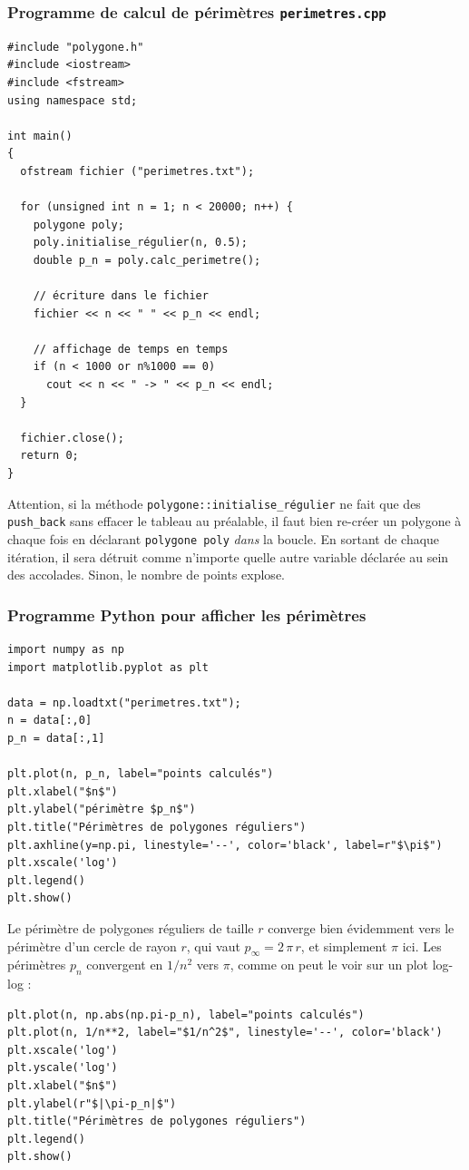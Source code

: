 \documentclass{book}
\newcommand{\inline}[1]{\texttt{#1}}
\begin{document}
\begin{correction}
\subsubsection*{Programme de calcul de périmètres \texttt{perimetres.cpp}}
\begin{verbatim}
#include "polygone.h"
#include <iostream>
#include <fstream>
using namespace std;

int main()
{
  ofstream fichier ("perimetres.txt");

  for (unsigned int n = 1; n < 20000; n++) {
    polygone poly;
    poly.initialise_régulier(n, 0.5);
    double p_n = poly.calc_perimetre();

    // écriture dans le fichier
    fichier << n << " " << p_n << endl;

    // affichage de temps en temps
    if (n < 1000 or n%1000 == 0)
      cout << n << " -> " << p_n << endl;
  }

  fichier.close();
  return 0;
}
\end{verbatim}

Attention, si la méthode \inline{polygone::initialise_régulier} ne fait que des \inline{push_back} sans effacer le tableau au préalable, il faut bien re-créer un polygone à chaque fois en déclarant \inline{polygone poly} {\em dans} la boucle. En sortant de chaque itération, il sera détruit comme n'importe quelle autre variable déclarée au sein des accolades. Sinon, le nombre de points explose.

\subsubsection*{Programme Python pour afficher les périmètres}

\begin{verbatim}
import numpy as np
import matplotlib.pyplot as plt

data = np.loadtxt("perimetres.txt");
n = data[:,0]
p_n = data[:,1]

plt.plot(n, p_n, label="points calculés")
plt.xlabel("$n$")
plt.ylabel("périmètre $p_n$")
plt.title("Périmètres de polygones réguliers")
plt.axhline(y=np.pi, linestyle='--', color='black', label=r"$\pi$")
plt.xscale('log')
plt.legend()
plt.show()
\end{verbatim}

Le périmètre de polygones réguliers de taille $r$ converge bien évidemment vers le périmètre d'un cercle de rayon $r$, qui vaut $p_\infty=2\,\pi\,r$, et simplement $\pi$ ici. Les périmètres $p_n$ convergent en $1/n^2$ vers $\pi$, comme on peut le voir sur un plot log-log :
\begin{verbatim}
plt.plot(n, np.abs(np.pi-p_n), label="points calculés")
plt.plot(n, 1/n**2, label="$1/n^2$", linestyle='--', color='black')
plt.xscale('log')
plt.yscale('log')
plt.xlabel("$n$")
plt.ylabel(r"$|\pi-p_n|$")
plt.title("Périmètres de polygones réguliers")
plt.legend()
plt.show()
\end{verbatim}


\end{correction}
\end{document}
